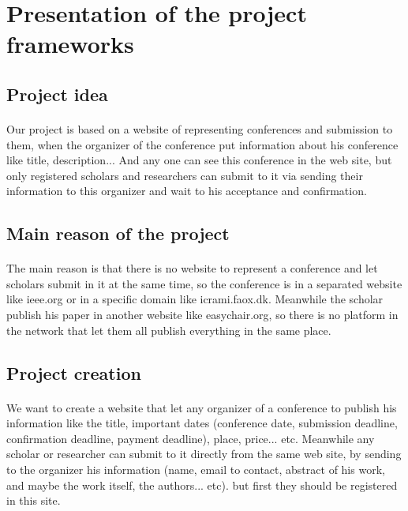 \section{Presentation of the project frameworks}
	\subsection{Project idea}
		\paragraph{}
		Our project is based on a website of representing conferences and submission to them, when the organizer of the conference put information about his conference like title, description... And any one can see this conference in the web site, but only registered scholars and researchers can submit to it via sending their information to this organizer and wait to his acceptance and confirmation.
	\subsection{Main reason of the project}
		\paragraph{}
		The main reason is that there is no website to represent a conference and let scholars submit in it at the same time, so the conference is in a separated website like ieee.org or in a specific domain like icrami.faox.dk. Meanwhile the scholar publish his paper in another website like easychair.org, so there is no platform in the network that let them all publish everything in the same place.
	\subsection{Project creation}
		\paragraph{}
		We want to create a website that let any organizer of a conference to publish his information like the title, important dates (conference date, submission deadline, confirmation deadline, payment deadline), place, price... etc. Meanwhile any scholar or researcher can submit to it directly from the same web site, by sending to the organizer his information (name, email to contact, abstract of his work, and maybe the work itself, the authors... etc). but first they should be registered in this site.
